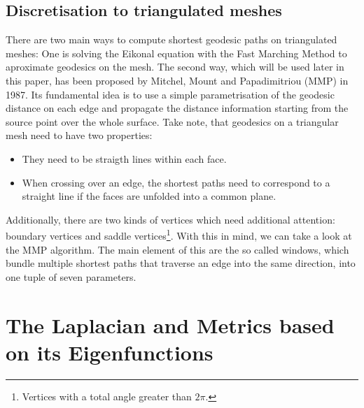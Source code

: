 \subsection*{Discretisation to triangulated meshes}
There are two main ways to compute shortest geodesic paths on triangulated meshes: One is solving the Eikonal equation with the Fast Marching Method to aproximate geodesics on the mesh.
The second way, which will be used later in this paper, has been proposed by Mitchel, Mount and Papadimitriou (MMP) in 1987.
Its fundamental idea is to use a simple parametrisation of the geodesic distance on each edge and propagate the distance information starting from the source point over the whole surface.
Take note, that geodesics on a triangular mesh need to have two properties:
\begin{itemize}
	\item They need to be straigth lines within each face.
	\item When crossing over an edge, the shortest paths need to correspond to a straight line if the faces are unfolded into a common plane.
\end{itemize}
Additionally, there are two kinds of vertices which need additional attention: boundary vertices and saddle vertices\footnote{Vertices with a total angle greater than $2\pi$.}. %
With this in mind, we can take a look at the MMP algorithm.
The main element of this are the so called windows, which bundle multiple shortest paths that traverse an edge into the same direction, into one tuple of seven parameters.

\section{The Laplacian and Metrics based on its Eigenfunctions}

